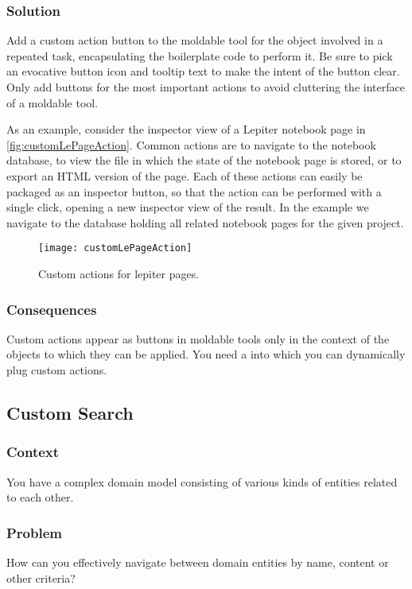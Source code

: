 \documentclass[sigconf]{acmart}
\newcommand{\pattern}[1]{\emph{\nameref{pat:#1}}\xspace}
\begin{document}
\subsubsection*{Solution}
Add a custom action button to the moldable tool for the object involved in a repeated task, encapsulating the boilerplate code to perform it.
Be sure to pick an evocative button icon and tooltip text to make the intent of the button clear.
Only add buttons for the most important actions to avoid cluttering the interface of a moldable tool.

As an example, consider the inspector view of a Lepiter notebook page in \autoref{fig:customLePageAction}.
Common actions are to navigate to the notebook database, to view the file in which the state of the notebook page is stored, or to export an HTML version of the page.
Each of these actions can easily be packaged as an inspector button, so that the action can be performed with a single click, opening a new inspector view of the result.
In the example we navigate to the database holding all related notebook pages for the given project.

\begin{figure}[h]
  \texttt{[image: customLePageAction]}
  \caption{Custom actions for lepiter pages.}
  \label{fig:customLePageAction}
\end{figure}

\subsubsection*{Consequences}
Custom actions appear as buttons in moldable tools only in the context of the objects to which they can be applied.
You need a \pattern{moldableTool} into which you can dynamically plug custom actions.

\subsection*{Custom Search}\label{pat:customSearch}
\subsubsection*{Context}
You have a complex domain model consisting of various kinds of entities related to each other.

\subsubsection*{Problem}
How can you effectively navigate between domain entities by name, content or other criteria?
\end{document}
